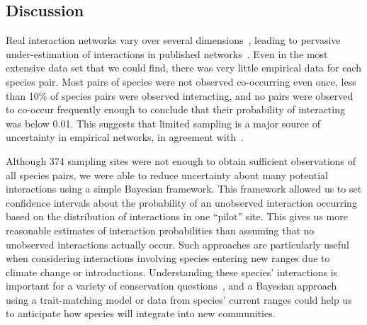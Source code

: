 \documentclass[12pt]{article}
\begin{document}
\begin{spacing}{2.0}

\section*{Discussion}


  Real interaction networks vary over several dimensions~\citep{Kitching1987,Olesen2011a,Pires2011a,Baiser2012,Fodrie2015,Novak2015}, leading to pervasive under-estimation of interactions in published networks~\citep{Jordano2016}. Even in the most extensive data set that we could find, there was very little empirical data for each species pair. Most pairs of species were not observed co-occurring even once, less than 10\% of species pairs were observed interacting, and no pairs were observed to co-occur frequently enough to conclude that their probability of interacting was below 0.01. This suggests that limited sampling is a major source of uncertainty in empirical networks, in agreement with~\citet{Jordano2016,Weinstein2017a,Weinstein2017}. 


  Although 374 sampling sites were not enough to obtain sufficient observations of all species pairs, we were able to reduce uncertainty about many potential interactions using a simple Bayesian framework. This framework allowed us to set confidence intervals about the probability of an unobserved interaction occurring based on the distribution of interactions in one ``pilot'' site. This gives us more reasonable estimates of interaction probabilities than assuming that no unobserved interactions actually occur. Such approaches are particularly useful when considering interactions involving species entering new ranges due to climate change or introductions. Understanding these species' interactions is important for a variety of conservation questions~\citep{Bartomeus2013,Gravel2013}, and a Bayesian approach using a trait-matching model or data from species' current ranges could help us to anticipate how species will integrate into new communities. 





\end{spacing}
\end{document}
